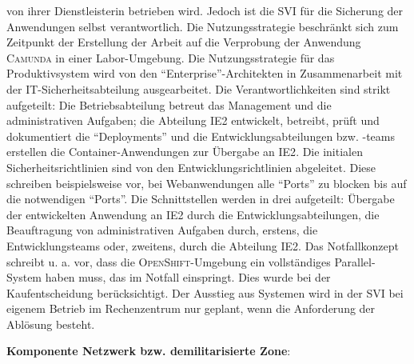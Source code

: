 von ihrer Dienstleisterin betrieben wird. Jedoch ist die \ac{SVI} für die Sicherung der Anwendungen selbst verantwortlich. Die Nutzungsstrategie beschränkt sich zum Zeitpunkt der Erstellung der Arbeit auf die Verprobung der Anwendung \textsc{Camunda} in einer Labor-Umgebung. Die Nutzungsstrategie für das Produktivsystem wird von den \enquote{Enterprise}-Architekten in Zusammenarbeit mit der IT-Sicherheitsabteilung ausgearbeitet. Die Verantwortlichkeiten sind strikt aufgeteilt: Die Betriebsabteilung betreut das Management und die administrativen Aufgaben; die Abteilung \ac{IE2} entwickelt, betreibt, prüft und dokumentiert die \enquote{Deployments} und die Entwicklungsabteilungen bzw. -teams erstellen die Container-Anwendungen zur Übergabe an \ac{IE2}. Die initialen Sicherheitsrichtlinien sind von den Entwicklungsrichtlinien abgeleitet. Diese schreiben beispielsweise vor, bei Webanwendungen alle \enquote{Ports} zu blocken bis auf die notwendigen \enquote{Ports}. Die Schnittstellen werden in drei aufgeteilt: Übergabe der entwickelten Anwendung an \ac{IE2} durch die Entwicklungsabteilungen, die Beauftragung von administrativen Aufgaben durch, erstens, die Entwicklungsteams oder, zweitens, durch die Abteilung \ac{IE2}. Das Notfallkonzept schreibt u. a. vor, dass die \textsc{OpenShift}-Umgebung ein vollständiges Parallel-System haben muss, das im Notfall einspringt. Dies wurde bei der Kaufentscheidung berücksichtigt. Der Ausstieg aus Systemen wird in der \ac{SVI} bei eigenem Betrieb im Rechenzentrum nur geplant, wenn die Anforderung der Ablösung besteht.
\par
\textbf{Komponente Netzwerk bzw. demilitarisierte Zone}:
\par
